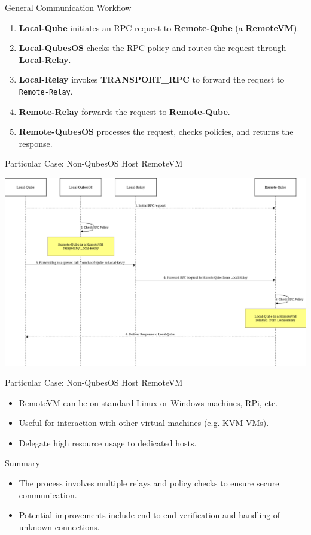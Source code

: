 \documentclass{beamer}
\begin{document}
\begin{frame}{General Communication Workflow}
    \begin{enumerate}
        \item \textbf{Local-Qube} initiates an RPC request to \textbf{Remote-Qube} (a \textbf{RemoteVM}).
        \item \textbf{Local-QubesOS} checks the RPC policy and routes the request through \textbf{Local-Relay}.
        \item \textbf{Local-Relay} invokes \textbf{TRANSPORT\_RPC} to forward the request to \texttt{Remote-Relay}.
        \item \textbf{Remote-Relay} forwards the request to \textbf{Remote-Qube}.
        \item \textbf{Remote-QubesOS} processes the request, checks policies, and returns the response.
    \end{enumerate}
\end{frame}

\begin{frame}{Particular Case: Non-QubesOS Host RemoteVM}
	\begin{center}
        \includegraphics[width=\linewidth]{particular.png}
    \end{center}
\end{frame}

\begin{frame}{Particular Case: Non-QubesOS Host RemoteVM}
    \begin{itemize}
        \item RemoteVM can be on standard Linux or Windows machines, RPi, etc.
        \item Useful for interaction with other virtual machines (e.g. KVM VMs).
		\item Delegate high resource usage to dedicated hosts.
    \end{itemize}
\end{frame}

\begin{frame}{Summary}
    \begin{itemize}
        \item The process involves multiple relays and policy checks to ensure secure communication.
        \item Potential improvements include end-to-end verification and handling of unknown connections.
    \end{itemize}
\end{frame}
\end{document}
